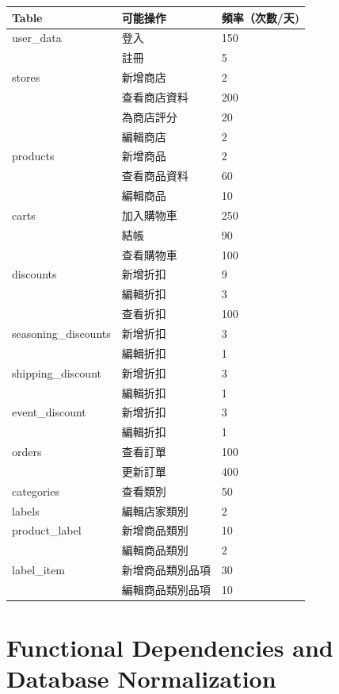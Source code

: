 \documentclass[a4paper, 12pt]{article}
\begin{document}
\noindent\begin{tabular}{ | p{12em} | p{9em} | p{9em} |}
  \hline 
  Table & 可能操作 & 頻率（次數/天)  \\
  \hline
  user_data 
        & 登入 & 150 \\
        & 註冊 & 5 \\
  \hline
  stores
        & 新增商店 & 2 \\
        & 查看商店資料 & 200 \\
        & 為商店評分 & 20 \\
        & 編輯商店 & 2 \\
  \hline
  products
        & 新增商品 & 2 \\
        & 查看商品資料 & 60 \\
        & 編輯商品 & 10 \\
  \hline
  carts
        & 加入購物車 & 250 \\
        & 結帳 & 90 \\
        & 查看購物車 & 100 \\
  \hline
  discounts 
        & 新增折扣 & 9 \\
        & 編輯折扣 & 3 \\
        & 查看折扣 & 100 \\
  \hline
  seasoning_discounts
        & 新增折扣 & 3 \\
        & 編輯折扣 & 1 \\
  \hline
  shipping_discount
        & 新增折扣 & 3 \\
        & 編輯折扣 & 1 \\
  \hline
  event_discount
        & 新增折扣 & 3 \\
        & 編輯折扣 & 1 \\
  \hline
  orders 
        & 查看訂單 & 100 \\
        & 更新訂單 & 400 \\
  \hline
  categories 
        & 查看類別 & 50 \\
  \hline
  labels 
        & 編輯店家類別 & 2 \\
  \hline
  product_label 
        & 新增商品類別 & 10 \\
        & 編輯商品類別 & 2 \\
  \hline
  label_item
        & 新增商品類別品項 & 30 \\
        & 編輯商品類別品項 & 10 \\
  \hline
\end{tabular}

\newpage
\section{Functional Dependencies and Database Normalization}
\end{document}
